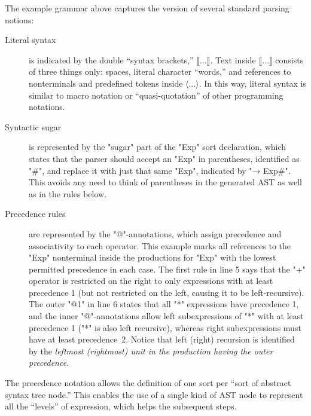 \documentclass[11pt]{article} %
\begin{document}
The example grammar above captures the \HAX version of several standard parsing notions:
\begin{description}

\item[Literal syntax] is indicated by the double ``syntax brackets,'' $⟦…⟧$. Text inside $⟦…⟧$
  consists of three things only: spaces, literal character ``words,'' and references to
  nonterminals and predefined tokens inside $⟨…⟩$.  In this way, literal syntax is similar to macro
  notation or ``quasi-quotation'' of other programming notations.

\item[Syntactic sugar] is represented by the "sugar" part of the "Exp" sort declaration, which
  states that the parser should accept an "Exp" in parentheses, identified as "#", and replace it
  with just that same "Exp", indicated by "→ Exp#".  This avoids any need to think of parentheses in
  the generated AST as well as in the rules below.

\item[Precedence rules] are represented by the "@"-annotations, which assign precedence and
  associativity to each operator. This example marks all references to the "Exp" nonterminal inside
  the productions for "Exp" with the lowest permitted precedence in each case. The first rule in
  line 5 says that the "+" operator is restricted on the right to only expressions with at least
  precedence 1 (but not restricted on the left, causing it to be left-recursive). The outer "@1" in
  line 6 states that all "*" expressions have precedence 1, and the inner "@"-annotations allow left
  subexpressions of "*" with at least precedence 1 ("*" is also left recursive), whereas right
  subexpressions must have at least precedence~2. Notice that left (right) recursion is identified
  by the \emph{leftmost (rightmost) unit in the production having the outer precedence}.

\end{description}
The precedence notation allows the definition of one sort per ``sort of abstract syntax tree node.''
This enables the use of a single kind of AST node to represent all the ``levels'' of expression,
which helps the subsequent steps.
\end{document}
